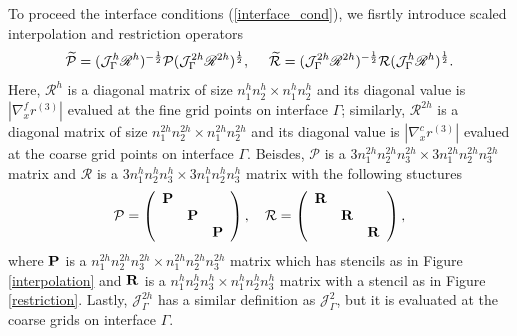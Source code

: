 To proceed the interface conditions (\ref{interface_cond}), we fisrtly introduce scaled interpolation and restriction operators
\[\widetilde{\mathcal{P}} = (\mathcal{J}^h_\Gamma \mathscr{R}^h)^{-\frac{1}{2}}\mathcal{P}(\mathcal{J}^{2h}_\Gamma \mathscr{R}^{2h})^{\frac{1}{2}},\ \ \ \ \widetilde{\mathcal{R}} =  (\mathcal{J}^{2h}_\Gamma \mathscr{R}^{2h})^{-\frac{1}{2}}\mathcal{R}(\mathcal{J}^{h}_\Gamma \mathscr{R}^h)^{\frac{1}{2}}.\]
Here, $\mathscr{R}^{h}$ is a diagonal matrix of size $n_1^{h}n_2^h\times n_1^hn_2^h$ and its diagonal value is $|\nabla_x^f r^{(3)}|$ evalued at the fine grid points on interface $\Gamma$; similarly, $\mathscr{R}^{2h}$ is a diagonal matrix of size $n_1^{2h}n_2^{2h}\times n_1^{2h}n_2^{2h}$ and its diagonal value is $|\nabla_x^c r^{(3)}|$ evalued at the coarse grid points on interface $\Gamma$. Beisdes, $\mathcal{P}$ is a $3n_1^{2h}n_2^{2h}n_3^{2h}\times 3n_1^{2h}n_2^{2h}n_3^{2h}$ matrix and $\mathcal{R}$ is a $3n_1^hn_2^hn_3^h\times 3n_1^hn_2^hn_3^h$ matrix with the following stuctures 
\begin{align}\label{iandr}
\mathcal{P} = \left(\begin{array}{ccc}
{\bf P}& ~  & ~ \\
~ & {\bf P} & ~ \\
~ &~  &{\bf P}\end{array}\right),\ \ \ \mathcal{R} = \left(\begin{array}{ccc}
{\bf R}& ~  & ~ \\
~ & {\bf R} & ~ \\
~ &~  &{\bf R}\end{array}\right),
\end{align}
where $\bf P$ is a $n_1^{2h}n_2^{2h}n_3^{2h}\times n_1^{2h}n_2^{2h}n_3^{2h}$ matrix which has stencils as in Figure \ref{interpolation} and $\bf R$ is a $n_1^hn_2^hn_3^h\times n_1^hn_2^hn_3^h$ matrix with a stencil as in Figure \ref{restriction}. Lastly, $\mathcal{J}^{2h}_\Gamma$ has a similar definition as $\mathcal{J}^{2}_\Gamma$, but it is evaluated at the coarse grids on interface $\Gamma$.

